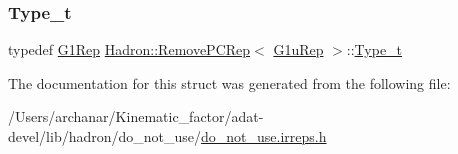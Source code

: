 \mbox{\label{structHadron_1_1RemovePCRep_3_01G1uRep_01_4_ad0b4cb2571a6aad91f0bd3daf9ac4df1}} 
\subsubsection{\texorpdfstring{Type\_t}{Type\_t}\hspace{0.1cm}{\footnotesize\ttfamily [2/2]}}
{\footnotesize\ttfamily typedef \mbox{\hyperlink{structHadron_1_1G1Rep}{G1\+Rep}} \mbox{\hyperlink{structHadron_1_1RemovePCRep}{Hadron\+::\+Remove\+P\+C\+Rep}}$<$ \mbox{\hyperlink{structHadron_1_1G1uRep}{G1u\+Rep}} $>$\+::\mbox{\hyperlink{structHadron_1_1RemovePCRep_3_01G1uRep_01_4_ad0b4cb2571a6aad91f0bd3daf9ac4df1}{Type\+\_\+t}}}



The documentation for this struct was generated from the following file\+:\begin{DoxyCompactItemize}
\item 
/\+Users/archanar/\+Kinematic\+\_\+factor/adat-\/devel/lib/hadron/do\+\_\+not\+\_\+use/\mbox{\hyperlink{adat-devel_2lib_2hadron_2do__not__use_2do__not__use_8irreps_8h}{do\+\_\+not\+\_\+use.\+irreps.\+h}}\end{DoxyCompactItemize}
